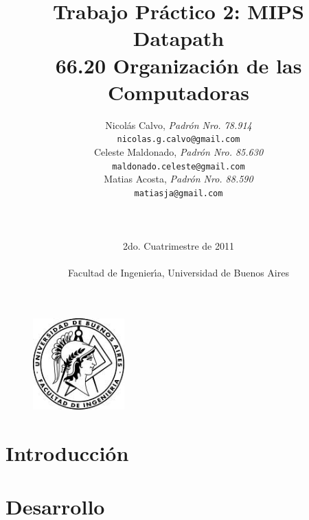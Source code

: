 \documentclass[a4paper,11pt]{article}
\title{ Trabajo Pr\'actico 2: MIPS Datapath   \\
        \Large{ 66.20 Organizaci\'on de las Computadoras } }
\author{Nicol\'as Calvo, \textit{Padr\'on Nro. 78.914}           	\\
            \texttt{ nicolas.g.calvo@gmail.com }      			\\
            Celeste Maldonado, \textit{Padr\'on Nro. 85.630}              	\\
            \texttt{ maldonado.celeste@gmail.com }                             \\
            Matias Acosta, \textit{Padr\'on Nro. 88.590}                \\
            \texttt{ matiasja@gmail.com }                     		\\
            \LARGE{}         						\\
            \LARGE{}         						\\
            \LARGE{}         						\\
            \Large{2do. Cuatrimestre de 2011}         	\\                       
            \texttt{}         						\\
            \Large{Facultad de Ingenier\'\i{}a, Universidad de Buenos Aires}            \\
       }
\date{}
\begin{document}
\begin{figure}
\centering
\includegraphics[width=100pt]{logofiuba.jpg}
\end{figure}


\maketitle
\thispagestyle{empty}   %


\newpage

\tableofcontents
\newpage

\setcounter{page}{1}

\section{Introducci\'on}


\paragraph{}


\section{Desarrollo}
\end{document}
